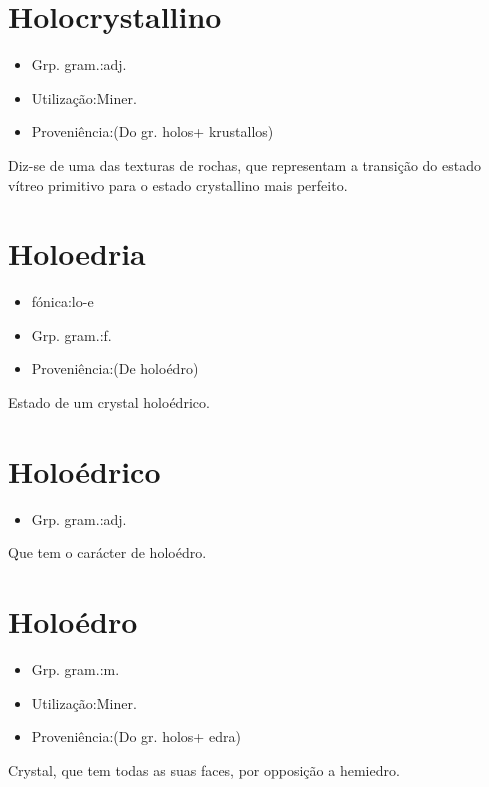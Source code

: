 \documentclass{article}
\begin{document}
\section{Holocrystallino}
\begin{itemize}
\item {Grp. gram.:adj.}
\end{itemize}
\begin{itemize}
\item {Utilização:Miner.}
\end{itemize}
\begin{itemize}
\item {Proveniência:(Do gr. \textunderscore holos\textunderscore  + \textunderscore krustallos\textunderscore )}
\end{itemize}
Diz-se de uma das texturas de rochas, que representam a transição do estado vítreo primitivo para o estado crystallino mais perfeito.
\section{Holoedria}
\begin{itemize}
\item {fónica:lo-e}
\end{itemize}
\begin{itemize}
\item {Grp. gram.:f.}
\end{itemize}
\begin{itemize}
\item {Proveniência:(De \textunderscore holoédro\textunderscore )}
\end{itemize}
Estado de um crystal holoédrico.
\section{Holoédrico}
\begin{itemize}
\item {Grp. gram.:adj.}
\end{itemize}
Que tem o carácter de holoédro.
\section{Holoédro}
\begin{itemize}
\item {Grp. gram.:m.}
\end{itemize}
\begin{itemize}
\item {Utilização:Miner.}
\end{itemize}
\begin{itemize}
\item {Proveniência:(Do gr. \textunderscore holos\textunderscore  + \textunderscore edra\textunderscore )}
\end{itemize}
Crystal, que tem todas as suas faces, por opposição a hemiedro.
\end{document}
